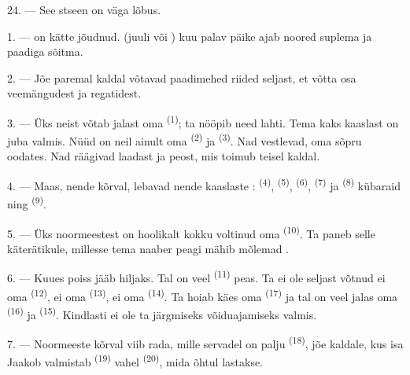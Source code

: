 24. --- See stseen on väga lõbus.

\VUsaut{4.0mm}
\VUsaut{3.0mm}

\VUsaut{2.4mm}

\VUsaut{3.0mm}

1. ---  on kätte jõudnud.  (juuli või ) kuu
palav päike ajab noored suplema ja paadiga sõitma.

2. --- Jõe paremal kaldal võtavad paadimehed riided seljast, et võtta osa veemängudest
ja regatidest.

3. --- Üks neist võtab jalast oma  \textsuperscript{(1)}; ta nööpib need
lahti. Tema kaks kaaslast on juba valmis. Nüüd on neil ainult oma 
\textsuperscript{(2)} ja  \textsuperscript{(3)}. Nad vestlevad, oma
sõpru oodates. Nad räägivad laadast ja peost, mis toimub teisel kaldal.

4. --- Maas, nende kõrval, lebavad nende kaaslaste : 
 \textsuperscript{(4)},  \textsuperscript{(5)},
 \textsuperscript{(6)},  \textsuperscript{(7)} ja
 \textsuperscript{(8)} kübaraid ning 
\textsuperscript{(9)}.

5. --- Üks noormeestest on hoolikalt kokku voltinud oma 
\textsuperscript{(10)}. Ta paneb selle käterätikule, millesse tema naaber peagi mähib
mõlemad .

6. --- Kuues poiss jääb hiljaks. Tal on veel  \textsuperscript{(11)}
peas. Ta ei ole seljast võtnud ei oma  \textsuperscript{(12)}, ei oma
 \textsuperscript{(13)}, ei oma  \textsuperscript{(14)}. Ta
hoiab käes oma  \textsuperscript{(17)} ja tal on veel jalas oma
 \textsuperscript{(16)} ja  \textsuperscript{(15)}. Kindlasti
ei ole ta järgmiseks võiduajamiseks valmis.

7. --- Noormeeste kõrval viib rada, mille servadel on palju 
\textsuperscript{(18)}, jõe kaldale, kus isa Jaakob valmistab 
\textsuperscript{(19)} vahel  \textsuperscript{(20)}, mida õhtul
lastakse.

